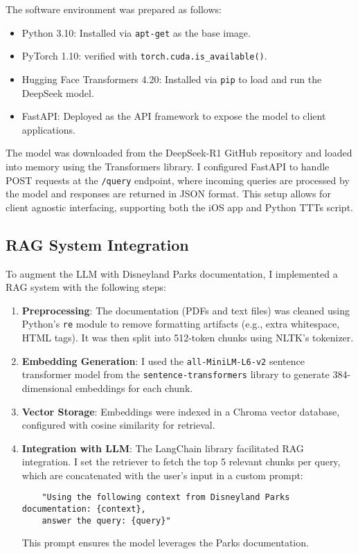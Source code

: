 \documentclass[11pt]{article}
\begin{document}
The software environment was prepared as follows:
\begin{itemize}
    \item Python 3.10: Installed via \texttt{apt-get} as the base image.
    \item PyTorch 1.10: verified with \texttt{torch.cuda.is\_available()}.
    \item Hugging Face Transformers 4.20: Installed via \texttt{pip} to load and run the DeepSeek model.
    \item FastAPI: Deployed as the API framework to expose the model to client applications.
\end{itemize}

The model was downloaded from the DeepSeek-R1 GitHub repository \cite{deepseek_r1_github} and loaded into memory using the Transformers library. I configured FastAPI to handle POST requests at the \texttt{/query} endpoint, where incoming queries are processed by the model and responses are returned in JSON format. This setup allows for client agnostic interfacing, supporting both the iOS app and Python TTTs script.

\subsection{RAG System Integration}
To augment the LLM with Disneyland Parks documentation, I implemented a RAG system with the following steps:
\begin{enumerate}
    \item \textbf{Preprocessing}: The documentation (PDFs and text files) was cleaned using Python’s \texttt{re} module to remove formatting artifacts (e.g., extra whitespace, HTML tags). It was then split into 512-token chunks using NLTK’s tokenizer.
    \item \textbf{Embedding Generation}: I used the \texttt{all-MiniLM-L6-v2} sentence transformer model from the \texttt{sentence-transformers} library to generate 384-dimensional embeddings for each chunk.
    \item \textbf{Vector Storage}: Embeddings were indexed in a Chroma vector database, configured with cosine similarity for retrieval.
    \item \textbf{Integration with LLM}: The LangChain library facilitated RAG integration. I set the retriever to fetch the top 5 relevant chunks per query, which are concatenated with the user’s input in a custom prompt:
    \begin{verbatim}
    "Using the following context from Disneyland Parks documentation: {context}, 
    answer the query: {query}"
    \end{verbatim}
    This prompt ensures the model leverages the Parks documentation.
\end{enumerate}
\end{document}
